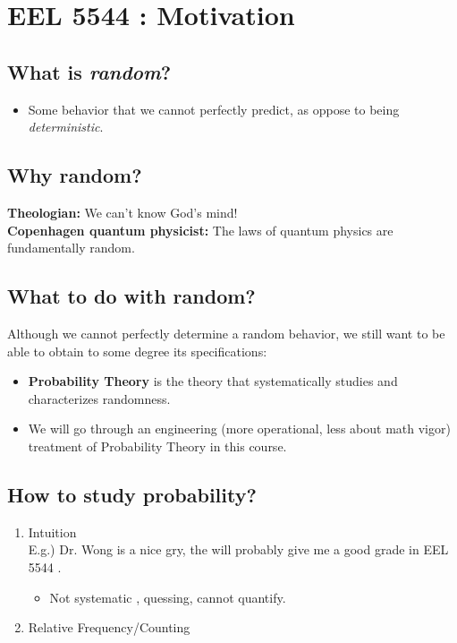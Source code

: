 
\section{EEL 5544 : Motivation}
\subsection{What is \emph{random}?}
\begin{itemize}
  \item Some behavior that we cannot perfectly predict, as oppose to
    being \emph{deterministic}.
\end{itemize}

\subsection{Why random?}
\textbf{Theologian:}  We can't know God's mind! \\
\textbf{Copenhagen quantum physicist:} The laws of quantum physics are fundamentally random.
  
\subsection{What to do with random?}
Although we cannot perfectly determine a random behavior, we still want to be
able to obtain to some degree its specifications:
\begin{itemize}
  \item \textbf{Probability Theory} is the theory that systematically studies and characterizes randomness.
  \item We will go through an engineering (more operational, less
    about math vigor) treatment of Probability Theory in this course.
\end{itemize}


\subsection{How to study probability?}
\begin{enumerate}
  \item Intuition\\
E.g.) Dr. Wong is a nice gry, the will probably give me a good grade in EEL 5544 .

\begin{itemize}
  \item[-] Not systematic , quessing, cannot quantify.
\end{itemize}

  \item Relative Frequency/Counting
\end{enumerate}

